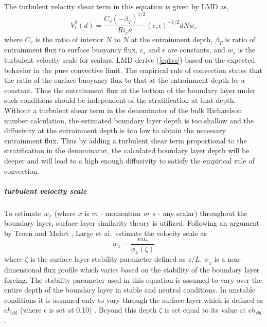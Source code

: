 The turbulent velocity shear term in this equation is given by LMD as,
\begin{equation}
  V_{t}^{2}(d)=\frac{C_v(-\beta_T)^{1/2}}{Ri_c
  \kappa}(c_s\epsilon)^{-1/2}dNw_s
  \label{eqtvs}
\end{equation}
where $C_v$ is the ratio of interior $N$ to $N$ at the entrainment
depth, $\beta_T$ is ratio of entrainment flux to surface buoyancy flux,
$c_s$ and $\epsilon$ are constants, and $w_s$ is the turbulent velocity
scale for scalars.
LMD derive (\ref{eqtvs}) based on the expected behavior in the pure
convective limit.  The empirical rule of convection states that the
ratio of the surface buoyancy flux to that at the entrainment depth be 
a constant.  Thus the entrainment flux at the
bottom of the boundary layer under such conditions should be
independent of the stratification at that depth.  Without a turbulent
shear term in the denominator of the bulk Richardson number
calculation, the estimated boundary layer depth is too shallow and the
diffusivity at the entrainment depth is too low to obtain the
necessary entrainment flux.  Thus by adding a turbulent shear term
proportional to the stratification in the denominator, the calculated
boundary layer depth will be deeper and will lead to a high enough
diffusivity to satisfy the empirical rule of convection.
  
\subparagraph{turbulent velocity scale}
To estimate $w_x$ (where $x$ is $m$ - momentum {\em or} $s$
- any scalar) throughout the boundary layer, surface layer similarity
theory is utilized.  Following an argument by Troen and Mahrt
\cite{TM86}, Large et al.\ estimate the velocity scale as
\begin{equation}
w_x=\frac{\kappa u_*}{\phi_x(\zeta)}
\end{equation}
where $\zeta$ is the surface layer stability parameter defined as
$z/L$.  $\phi_x$ is a non-dimensional flux profile which varies based
on the stability of the boundary layer forcing.  The stability
parameter used in this equation is assumed to vary over the entire
depth of the boundary layer in stable and neutral conditions.  In
unstable conditions it is assumed only to vary through the surface
layer which is defined as $ \epsilon h_{sbl} $ (where $\epsilon$ is
set at 0.10) .  Beyond this depth $\zeta$
is set equal to its value at $ \epsilon h_{sbl} $.

